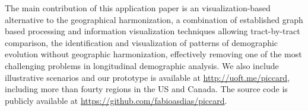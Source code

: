 The main contribution of this application paper is an visualization-based
alternative to the geographical harmonization, a combination of established
graph based processing and information visualization techniques allowing
tract-by-tract comparison, the identification and visualization of patterns of
demographic evolution without geographic harmonization, effectively removing one
of the most challenging problems in longitudinal demographic analysis. We also
include illustrative scenarios and our prototype is available at
\url{http://uoft.me/piccard}, including more than fourty regions in the US and
Canada. The source code is publicly available at
\url{https://github.com/fabioasdias/piccard}.

